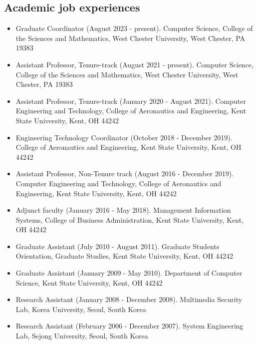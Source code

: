 \documentclass{article}
\begin{document}
\subsection*{Academic job experiences}\vspace{-0.5em}
\begin{itemize}
 \setlength\itemsep{-0.5em}
    \item Graduate Coordinator (August 2023 - present). 
Computer Science, College of the Sciences and Mathematics,
West Chester University, West Chester, PA 19383
    \item Assistant Professor, Tenure-track (August 2021 - present).
Computer Science, College of the Sciences and Mathematics, 
West Chester University, West Chester, PA 19383
    \item Assistant Professor, Tenure-track (January 2020 - August 2021).
Computer Engineering and Technology, College of Aeronautics and Engineering, 
Kent State University, Kent, OH 44242
    \item Engineering Technology Coordinator (October 2018 - December 2019).
College of Aeronautics and Engineering, Kent State University, Kent, OH 44242
    \item Assistant Professor, Non-Tenure track (August 2016 - December 2019).
Computer Engineering and Technology, College of Aeronautics and Engineering, 
Kent State University, Kent, OH 44242
    \item Adjunct faculty (January 2016 - May 2018).
Management Information Systems, College of Business Administration, Kent State University, Kent, OH 44242
    \item Graduate Assistant (July 2010 - August 2011).
Graduate Students Orientation, Graduate Studies, Kent State University, Kent, OH 44242
    \item Graduate Assistant (January 2009 - May 2010).
Department of Computer Science, Kent State University, Kent, OH 44242
    \item Research Assistant (January 2008 - December 2008).
Multimedia Security Lab, Korea University, Seoul, South Korea
    \item Research Assistant (February 2006 - December 2007).
System Engineering Lab, Sejong University, Seoul, South Korea
\end{itemize}
\end{document}
